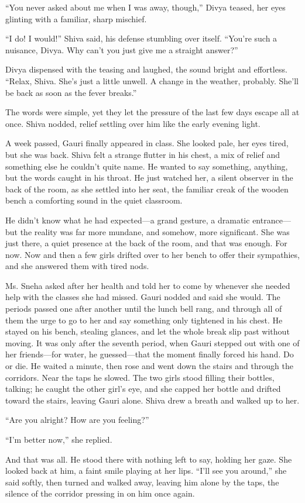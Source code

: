 ``You never asked about me when I was away, though,'' Divya teased, her eyes glinting with a familiar, sharp mischief.

``I do! I would!'' Shiva said, his defense stumbling over itself. ``You're such a nuisance, Divya. Why can't you just give me a straight answer?''

Divya dispensed with the teasing and laughed, the sound bright and effortless. ``Relax, Shiva. She's just a little unwell. A change in the weather, probably. She'll be back as soon as the fever breaks.''

The words were simple, yet they let the pressure of the last few days escape all at once. Shiva nodded, relief settling over him like the early evening light.

A week passed, Gauri finally appeared in class. She looked pale, her eyes tired, but she was back. Shiva felt a strange flutter in his chest, a mix of relief and something else he couldn't quite name. He wanted to say something, anything, but the words caught in his throat. He just watched her, a silent observer in the back of the room, as she settled into her seat, the familiar creak of the wooden bench a comforting sound in the quiet classroom.

He didn't know what he had expected—a grand gesture, a dramatic entrance—but the reality was far more mundane, and somehow, more significant. She was just there, a quiet presence at the back of the room, and that was enough. For now. Now and then a few girls drifted over to her bench to offer their sympathies, and she answered them with tired nods.

Ms. Sneha asked after her health and told her to come by whenever she needed help with the classes she had missed. Gauri nodded and said she would. The periods passed one after another until the lunch bell rang, and through all of them the urge to go to her and say something only tightened in his chest. He stayed on his bench, stealing glances, and let the whole break slip past without moving. It was only after the seventh period, when Gauri stepped out with one of her friends—for water, he guessed—that the moment finally forced his hand. Do or die. He waited a minute, then rose and went down the stairs and through the corridors. Near the taps he slowed. The two girls stood filling their bottles, talking; he caught the other girl's eye, and she capped her bottle and drifted toward the stairs, leaving Gauri alone. Shiva drew a breath and walked up to her.

``Are you alright? How are you feeling?''

``I'm better now,'' she replied.

And that was all. He stood there with nothing left to say, holding her gaze. She looked back at him, a faint smile playing at her lips. ``I'll see you around,'' she said softly, then turned and walked away, leaving him alone by the taps, the silence of the corridor pressing in on him once again.
